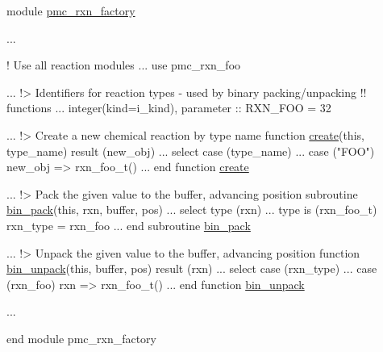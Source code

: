 \begin{DoxyCode}
\textcolor{keyword}{module} \mbox{\hyperlink{namespacepmc__rxn__factory}{pmc\_rxn\_factory}}

 ...

 \textcolor{comment}{! Use all reaction modules}
 ...
 \textcolor{keywordtype}{use }pmc\_rxn\_foo

 ...
\textcolor{comment}{}
\textcolor{comment}{ !> Identifiers for reaction types - used by binary packing/unpacking }
\textcolor{comment}{ !! functions}
 ...
 \textcolor{keywordtype}{integer(kind=i\_kind)}, \textcolor{keywordtype}{parameter} :: RXN\_FOO = 32

 ...
\textcolor{comment}{}
\textcolor{comment}{ !> Create a new chemical reaction by type name}
\textcolor{keyword}{ function }\mbox{\hyperlink{namespacepmc__aero__rep__factory_a72db65ee6fcec381e8315f2de1601953}{create}}(this, type\_name) \textcolor{keyword}{result} (new\_obj)
   ...
   \textcolor{keywordflow}{select case} (type\_name)
     ...
     \textcolor{keywordflow}{case} (\textcolor{stringliteral}{"FOO"})
       new\_obj => rxn\_foo\_t()
   ...
\textcolor{keyword}{ end function }\mbox{\hyperlink{namespacepmc__aero__rep__factory_a72db65ee6fcec381e8315f2de1601953}{create}}

 ...
\textcolor{comment}{}
\textcolor{comment}{ !> Pack the given value to the buffer, advancing position}
\textcolor{keyword}{ subroutine }\mbox{\hyperlink{namespacepmc__aero__phase__data_a3ee028d1595f33610a4359ddeb5fe249}{bin\_pack}}(this, rxn, buffer, pos)
   ...
   \textcolor{keywordflow}{select type} (rxn)
     ...
\textcolor{keywordflow}{     type is} (rxn\_foo\_t)
       rxn\_type = rxn\_foo
   ...
\textcolor{keyword}{ end subroutine }\mbox{\hyperlink{namespacepmc__aero__phase__data_a3ee028d1595f33610a4359ddeb5fe249}{bin\_pack}}

 ...
\textcolor{comment}{}
\textcolor{comment}{ !> Unpack the given value to the buffer, advancing position}
\textcolor{keyword}{ function }\mbox{\hyperlink{namespacepmc__aero__phase__data_ab248ad8c703acdfc5f771aaca4671218}{bin\_unpack}}(this, buffer, pos) \textcolor{keyword}{result} (rxn)
   ...
   \textcolor{keywordflow}{select case} (rxn\_type)
     ...
     \textcolor{keywordflow}{case} (rxn\_foo)
       rxn => rxn\_foo\_t()
   ...
\textcolor{keyword}{ end function }\mbox{\hyperlink{namespacepmc__aero__phase__data_ab248ad8c703acdfc5f771aaca4671218}{bin\_unpack}}

 ...

\textcolor{keyword}{end module }pmc\_rxn\_factory
\end{DoxyCode}


